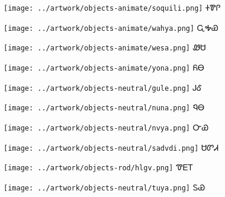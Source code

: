 \documentclass[avery5371]{flashcards}%
\begin{document}
\begin{flashcard}{
\texttt{[image: ../artwork/objects-animate/soquili.png]}
}
\Huge ᏐᏈᎵ
\end{flashcard}

\begin{flashcard}{
\texttt{[image: ../artwork/objects-animate/wahya.png]}
}
\Huge ᏩᎭᏯ
\end{flashcard}

\begin{flashcard}{
\texttt{[image: ../artwork/objects-animate/wesa.png]}
}
\Huge ᏪᏌ
\end{flashcard}

\begin{flashcard}{
\texttt{[image: ../artwork/objects-animate/yona.png]}
}
\Huge ᏲᎾ
\end{flashcard}


\begin{flashcard}{
\texttt{[image: ../artwork/objects-neutral/gule.png]}
}
\Huge ᎫᎴ
\end{flashcard}

\begin{flashcard}{
\texttt{[image: ../artwork/objects-neutral/nuna.png]}
}
\Huge ᏄᎾ
\end{flashcard}

\begin{flashcard}{
\texttt{[image: ../artwork/objects-neutral/nvya.png]}
}
\Huge ᏅᏯ
\end{flashcard}

\begin{flashcard}{
\texttt{[image: ../artwork/objects-neutral/sadvdi.png]}
}
\Huge ᏌᏛᏗ
\end{flashcard}

\begin{flashcard}{
\texttt{[image: ../artwork/objects-rod/hlgv.png]}
}
\Huge ᏡᎬᎢ
\end{flashcard}

\begin{flashcard}{
\texttt{[image: ../artwork/objects-neutral/tuya.png]}
}
\Huge ᏚᏯ
\end{flashcard}
\end{document}
